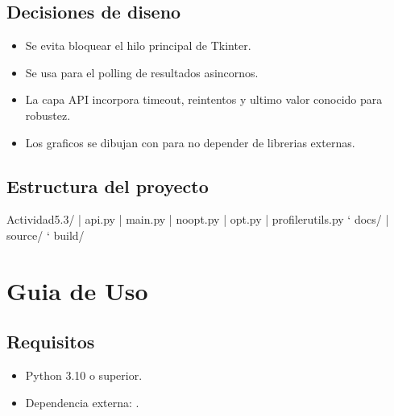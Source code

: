 \documentclass[letterpaper,10pt,spanish]{sphinxmanual}
\begin{document}
\subsection{Decisiones de diseno}
\label{\detokenize{arquitectura:decisiones-de-diseno}}\begin{itemize}
\item {} 
\sphinxAtStartPar
Se evita bloquear el hilo principal de Tkinter.

\item {} 
\sphinxAtStartPar
Se usa  para el polling de resultados asincornos.

\item {} 
\sphinxAtStartPar
La capa API incorpora timeout, reintentos y ultimo valor conocido para robustez.

\item {} 
\sphinxAtStartPar
Los graficos se dibujan con  para no depender de librerias externas.

\end{itemize}


\subsection{Estructura del proyecto}
\label{\detokenize{arquitectura:estructura-del-proyecto}}
\begin{sphinxVerbatim}[commandchars=\\\{\}]
Actividad\PYGZus{}5.3/
|\PYGZhy{} api.py
|\PYGZhy{} main.py
|\PYGZhy{} no\PYGZus{}opt.py
|\PYGZhy{} opt.py
|\PYGZhy{} profiler\PYGZus{}utils.py
`\PYGZhy{} docs/
   |\PYGZhy{} source/
   `\PYGZhy{} build/
\end{sphinxVerbatim}

\sphinxstepscope


\section{Guia de Uso}
\label{\detokenize{uso:guia-de-uso}}\label{\detokenize{uso::doc}}

\subsection{Requisitos}
\label{\detokenize{uso:requisitos}}\begin{itemize}
\item {} 
\sphinxAtStartPar
Python 3.10 o superior.

\item {} 
\sphinxAtStartPar
Dependencia externa: .

\end{itemize}
\end{document}
